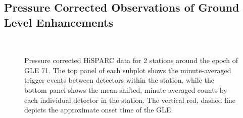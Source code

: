\subsection{Pressure Corrected Observations of Ground Level Enhancements}


\begin{figure}[ht]
	\centering
	 \\
	
	
	\caption{Pressure corrected HiSPARC data for 2 stations around the epoch of GLE 71. The top panel of each subplot shows the minute-averaged trigger events between detectors within the station, while the bottom panel shows the mean-shifted, minute-averaged counts by each individual detector in the station. The vertical red, dashed line depicts the approximate onset time of the GLE.}
	\label{fig:GLE_71_Pcorr}
\end{figure}


